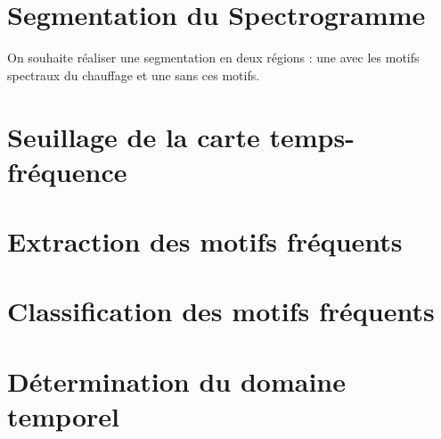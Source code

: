 \documentclass[10pt,a4paper]{article}
\begin{document}
\section{Segmentation du Spectrogramme}
 On souhaite réaliser une segmentation en deux régions : une avec les motifs spectraux du chauffage et une sans ces motifs.
 
 
\section{Seuillage de la carte temps-fréquence}


\section{Extraction des motifs fréquents}


\section{Classification des motifs fréquents}


\section{Détermination du domaine temporel}
\end{document}
